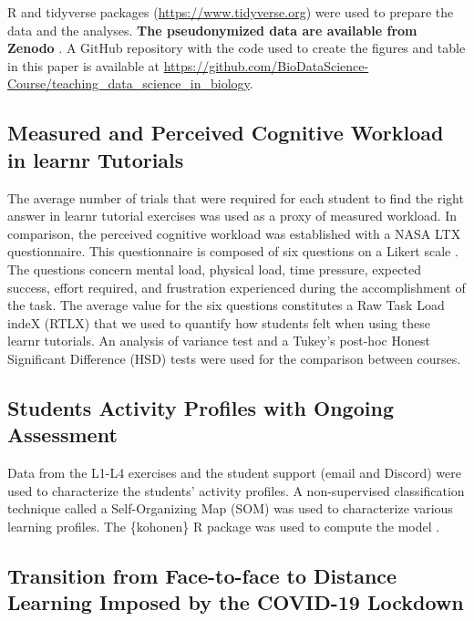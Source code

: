 \documentclass{aims}
\theoremstyle{definition}
\begin{document}
R and tidyverse \cite{Wickham2019} packages
(\url{https://www.tidyverse.org}) were used to prepare the data and the
analyses. \textbf{The pseudonymized data are available from Zenodo}
\cite{Grosjeandataset2020, Grosjeandataset2019}. A GitHub repository
with the code used to create the figures and table in this paper is
available at
\url{https://github.com/BioDataScience-Course/teaching_data_science_in_biology}.

\hypertarget{measured-and-perceived-cognitive-workload-in-learnr-tutorials}{%
\subsection{Measured and Perceived Cognitive Workload in learnr
Tutorials}\label{measured-and-perceived-cognitive-workload-in-learnr-tutorials}}

The average number of trials that were required for each student to find
the right answer in learnr tutorial exercises was used as a proxy of
measured workload. In comparison, the perceived cognitive workload was
established with a NASA LTX questionnaire. This questionnaire is
composed of six questions on a Likert scale \cite{Hart1988}. The
questions concern mental load, physical load, time pressure, expected
success, effort required, and frustration experienced during the
accomplishment of the task. The average value for the six questions
constitutes a Raw Task Load indeX (RTLX) \cite{Byers1989} that we used
to quantify how students felt when using these learnr tutorials. An
analysis of variance test and a Tukey's post-hoc Honest Significant
Difference (HSD) tests were used for the comparison between courses.

\hypertarget{students-activity-profiles-with-ongoing-assessment}{%
\subsection{Students Activity Profiles with Ongoing
Assessment}\label{students-activity-profiles-with-ongoing-assessment}}

Data from the L1-L4 exercises and the student support (email and
Discord) were used to characterize the students' activity profiles. A
non-supervised classification technique called a Self-Organizing Map
(SOM) \cite{Kohonen1995} was used to characterize various learning
profiles. The \{kohonen\} R package was used to compute the model
\cite{Wehrens2018}.

\hypertarget{transition-from-face-to-face-to-distance-learning-imposed-by-the-covid-19-lockdown}{%
\subsection{Transition from Face-to-face to Distance Learning Imposed by
the COVID-19
Lockdown}\label{transition-from-face-to-face-to-distance-learning-imposed-by-the-covid-19-lockdown}}
\end{document}

